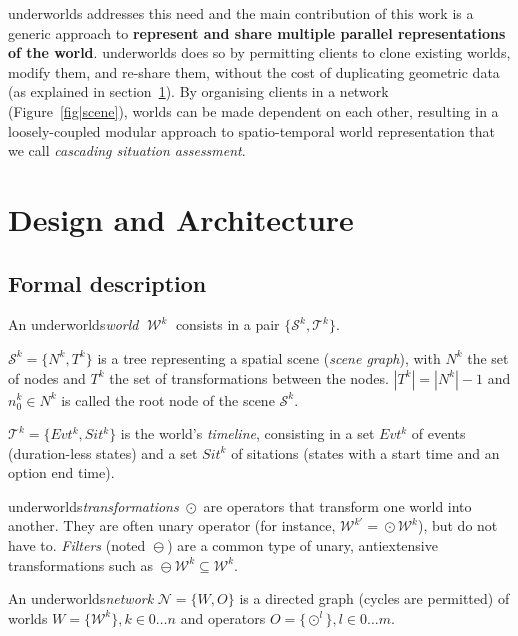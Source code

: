 \documentclass[conference]{IEEEtran}
\newcommand{\uwds}{{\sc underworlds}\xspace}
\DeclareMathOperator{\transform}{\odot}
\DeclareMathOperator{\filter}{\ominus}
\DeclareMathOperator{\W}{\mathcal{W}}
\begin{document}
\uwds addresses this need and the main contribution of this work is a generic
approach to \textbf{represent and share multiple parallel representations of the
world}. \uwds does so by permitting clients to clone existing worlds, modify
them, and re-share them, without the cost of duplicating geometric data (as
explained in section~\ref{design}). By organising clients in a network
(Figure~\ref{fig|scene}), worlds can be made dependent on each other, resulting
in a loosely-coupled modular approach to spatio-temporal world representation
that we call \emph{cascading situation assessment}.


\section{Design and Architecture}
\label{design}

\subsection{Formal description}

An \uwds \emph{world} $\W^k$ consists in a pair $\{\mathcal{S}^k,
\mathcal{T}^k\}$.

$\mathcal{S}^k=\{N^k, T^k\}$ is a tree representing a spatial
scene (\emph{scene graph}), with $N^k$ the set of nodes and $T^k$ the set of
transformations between the nodes. $|T^k| = |N^k| - 1$ and $n^k_0 \in N^k$ is
called the root node of the scene $\mathcal{S}^k$.

$\mathcal{T}^k=\{Evt^k, Sit^k\}$ is the world's \emph{timeline}, consisting in a
set $Evt^k$ of events (duration-less states) and a set $Sit^k$ of sitations
(states with a start time and an option end time).

\uwds \emph{transformations} $\transform$ are operators that transform one world into
another. They are often unary operator (for instance, $\mathcal{W}^{k'} =
\transform\mathcal{W}^k$), but do not have to. \emph{Filters} (noted $\filter$)
are a common type of unary, antiextensive transformations such as
$\filter\mathcal{W}^k \subseteq \mathcal{W}^k$.

An \uwds \emph{network} $\mathcal{N} = \{W, O\}$ is a directed graph (cycles are
permitted) of worlds $W=\{\mathcal{W}^k\}, k\in0\ldots n$ and operators
$O=\{\transform^l\}, l \in 0\ldots m$.

\end{document}
